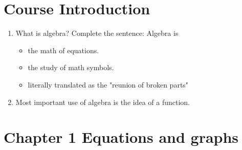 \documentclass{article}
\begin{document}
\section{Course Introduction}

\begin{enumerate}
\item What is algebra? Complete the sentence: Algebra is
\begin{itemize}
\item the math of equations.
\item the study of math symbols.
\item literally translated as the "reunion of broken parts"
\end{itemize}
\item Most important use of algebra is the idea of a function.
\end{enumerate}

\section{Chapter 1 Equations and graphs}
\end{document}

